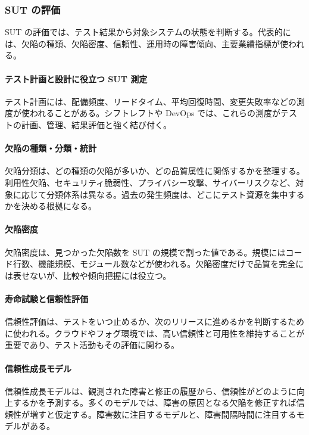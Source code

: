 \subsubsection{SUT の評価}
SUT の評価では、テスト結果から対象システムの状態を判断する。代表的には、欠陥の種類、欠陥密度、信頼性、運用時の障害傾向、主要業績指標が使われる。

\paragraph{テスト計画と設計に役立つ SUT 測定}
テスト計画には、配備頻度、リードタイム、平均回復時間、変更失敗率などの測度が使われることがある。シフトレフトや DevOps では、これらの測度がテストの計画、管理、結果評価と強く結び付く。

\paragraph{欠陥の種類・分類・統計}
欠陥分類は、どの種類の欠陥が多いか、どの品質属性に関係するかを整理する。利用性欠陥、セキュリティ脆弱性、プライバシー攻撃、サイバーリスクなど、対象に応じて分類体系は異なる。過去の発生頻度は、どこにテスト資源を集中するかを決める根拠になる。

\paragraph{欠陥密度}
欠陥密度は、見つかった欠陥数を SUT の規模で割った値である。規模にはコード行数、機能規模、モジュール数などが使われる。欠陥密度だけで品質を完全には表せないが、比較や傾向把握には役立つ。

\paragraph{寿命試験と信頼性評価}
信頼性評価は、テストをいつ止めるか、次のリリースに進めるかを判断するために使われる。クラウドやフォグ環境では、高い信頼性と可用性を維持することが重要であり、テスト活動もその評価に関わる。

\paragraph{信頼性成長モデル}
信頼性成長モデルは、観測された障害と修正の履歴から、信頼性がどのように向上するかを予測する。多くのモデルでは、障害の原因となる欠陥を修正すれば信頼性が増すと仮定する。障害数に注目するモデルと、障害間隔時間に注目するモデルがある。
